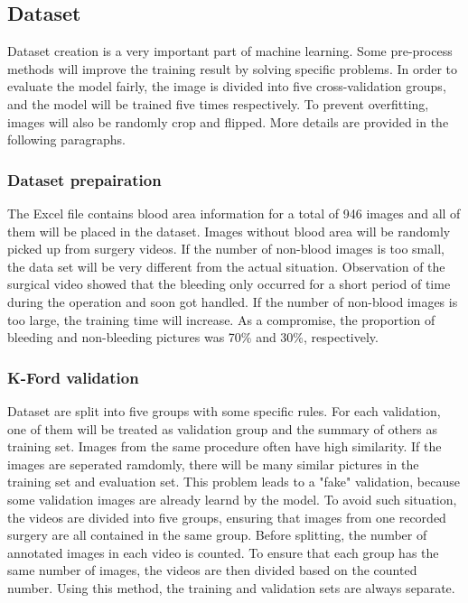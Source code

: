\documentclass[10pt,journal,compsoc]{IEEEtran}
\begin{document}
\subsection{Dataset}
Dataset creation is a very important part of machine learning. 
Some pre-process methods will improve the \linebreak training result by solving specific problems. 
In order to evaluate the model fairly, the image is divided into five \linebreak cross-validation groups, and the model will be trained five times respectively.
To prevent overfitting, images will also be randomly crop and flipped.
More details are provided in the following paragraphs.

\subsubsection{Dataset prepairation}
The Excel file contains blood area information for a total of 946 images and all of them will be placed in the dataset.
Images without blood area will be randomly picked up from surgery videos. 
If the number of non-blood images is too small, the data set will be very different from the actual situation. 
Observation of the surgical video showed that the bleeding only occurred for a short period of time during the operation and soon got handled.
If the number of \linebreak non-blood images is too large, the training time will \linebreak increase.
As a compromise, the proportion of bleeding and non-bleeding pictures was 70\% and 30\%, respectively.

\subsubsection{K-Ford validation}
Dataset are split into five groups with some specific rules.
For each validation, one of them will be treated as validation group and the summary of others as training set. 
Images from the same procedure often have high similarity. 
If the images are seperated ramdomly, there will be many similar pictures in the training set and evaluation set.
This problem leads to a "fake" validation, because some validation images are already learnd by the model.
To avoid such situation, the videos are divided into five groups, ensuring that images from one recorded surgery are all contained in the same group.
Before splitting, the number of annotated images in each video is counted.
To ensure that each group has the same number of images, the videos are then divided based on the counted number.
Using this method, the training and validation sets are always separate.
\end{document}
